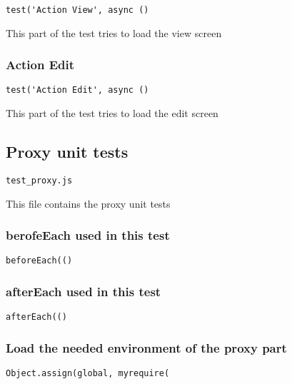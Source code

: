 \documentclass[a4paper]{article}
\begin{document}
\begin{lstlisting}
test('Action View', async ()
\end{lstlisting}

This part of the test tries to load the view screen

\hypertarget{toc234}{}
\subsubsection{Action Edit}

\begin{lstlisting}
test('Action Edit', async ()
\end{lstlisting}

This part of the test tries to load the edit screen

\hypertarget{toc235}{}
\subsection{Proxy unit tests}

\begin{lstlisting}
test_proxy.js
\end{lstlisting}

This file contains the proxy unit tests

\hypertarget{toc236}{}
\subsubsection{berofeEach used in this test}

\begin{lstlisting}
beforeEach(()
\end{lstlisting}

\hypertarget{toc237}{}
\subsubsection{afterEach used in this test}

\begin{lstlisting}
afterEach(()
\end{lstlisting}

\hypertarget{toc238}{}
\subsubsection{Load the needed environment of the proxy part}

\begin{lstlisting}
Object.assign(global, myrequire(
\end{lstlisting}
\end{document}
